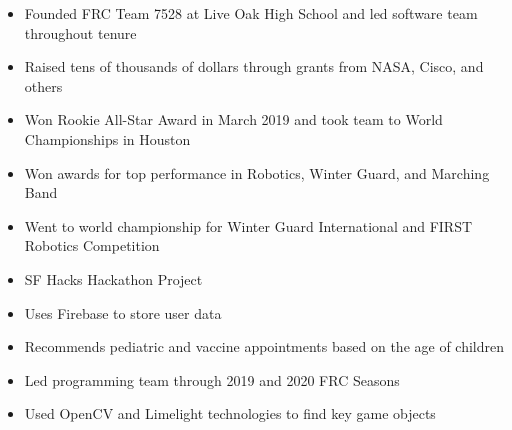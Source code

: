 \documentclass[10pt,a4paper,ragged2e,withhyper]{altacv}
\begin{document}
\begin{paracol}{2}
            \begin{itemize}
                \item Founded FRC Team 7528 at Live Oak High School and led software team throughout tenure
                \item Raised tens of thousands of dollars through grants from NASA, Cisco, and others
                \item Won Rookie All-Star Award in March 2019 and took team to World Championships in Houston
            \end{itemize}


            \divider

            \begin{itemize}
                \item Won awards for top performance in Robotics, Winter Guard, and Marching Band
                \item Went to world championship for Winter Guard International and FIRST Robotics Competition
            \end{itemize}





                        \begin{itemize}
                \item SF Hacks Hackathon Project
                \item Uses Firebase to store user data
                \item Recommends pediatric and vaccine appointments based on the age of children
            \end{itemize}

            \begin{itemize}
                \item Led programming team through 2019 and 2020 FRC Seasons
                \item Used OpenCV and Limelight technologies to find key game objects
            \end{itemize}
            \divider


    \end{paracol}
\end{document}

